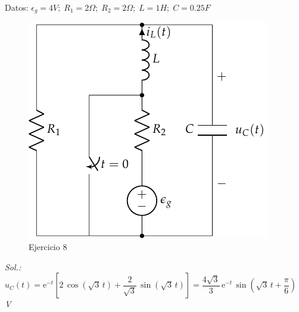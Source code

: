 \begin{enumerate}
Datos: $\epsilon_g = 4V;\; R_1 = {2}{\Omega};\; R_2 = {2}{\Omega};\; L = {1}{H};\; C = {0.25}{F}    $
\begin{figure}[H]
    \centering
    \includegraphics{../figs/FM_4_9.pdf}
    \caption{Ejercicio 8}
    \label{fig.FM_4_9}
\end{figure}

\emph{Sol.: $u_C(t)= \mathrm{e}^{-t}\left[2\,\cos(\sqrt{3}\,t)+\dfrac{2}{\sqrt{3}}\,\sin(\sqrt{3}\,t)\right]=\dfrac{4\sqrt{3}}{3}\,\mathrm{e}^{-t}\,\sin\left(\sqrt{3}\,t+\dfrac{\pi}{6}\right)$ V}


\end{enumerate}
